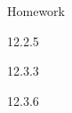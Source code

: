 \begin{frame}{Homework}
  \begin{center}

  12.2.5

  \vspace{2em}

  12.3.3

  \vspace{2em}

  12.3.6

  \end{center}
\end{frame}








